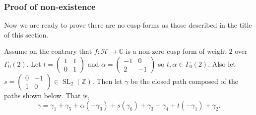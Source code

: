 \documentclass{article}
\theoremstyle{definition}
\theoremstyle{definition}
\theoremstyle{definition}
\newcommand{\SLZ}{\operatorname{SL}_2(\mathbb{Z})}
\begin{document}
\subsubsection{Proof of non-existence}

Now we are ready to prove there are no cusp forms as those described in the title of this section.

Assume on the contrary that $f : \mathcal{H} \rightarrow \mathbb{C}$ is a non-zero cusp form
of weight $2$ over $\Gamma_0 (2)$. Let $t = \begin{pmatrix}
  1 & 1\\
  0 & 1
\end{pmatrix}$ and $\alpha = \begin{pmatrix}
  - 1 & 0\\
  2 & - 1
\end{pmatrix}$ so $t, \alpha \in \Gamma_0 (2)$. Also let $s =
\begin{pmatrix}
  0 & - 1\\
  1 & 0
\end{pmatrix} \in \SLZ$. Then let $\gamma$ be the closed path composed of the paths shown below. That is, 
$$\gamma=\gamma_1+\gamma_5+\alpha(-\gamma_3)+s(\gamma_6)+\gamma_3+\gamma_4+t(-\gamma_1)+\gamma_2.$$
\begin{center}
\end{center}
\end{document}
